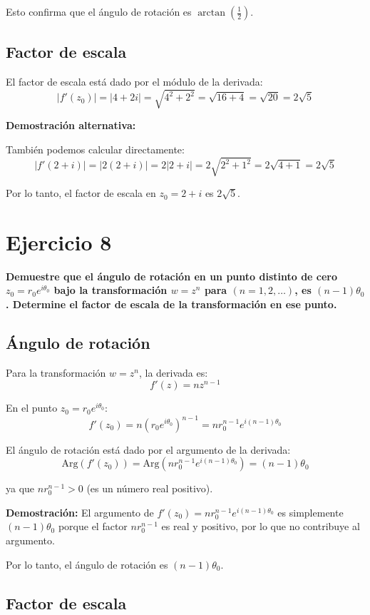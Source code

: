 \documentclass{article}
\begin{document}
Esto confirma que el ángulo de rotación es $\arctan\left(\frac{1}{2}\right)$.

\subsection*{Factor de escala}

El factor de escala está dado por el módulo de la derivada:
$$|f'(z_0)| = |4 + 2i| = \sqrt{4^2 + 2^2} = \sqrt{16 + 4} = \sqrt{20} = 2\sqrt{5}$$

\textbf{Demostración alternativa:}

También podemos calcular directamente:
$$|f'(2 + i)| = |2(2 + i)| = 2|2 + i| = 2\sqrt{2^2 + 1^2} = 2\sqrt{4 + 1} = 2\sqrt{5}$$

Por lo tanto, el factor de escala en $z_0 = 2 + i$ es $2\sqrt{5}$.

\section*{Ejercicio 8}

\textbf{Demuestre que el ángulo de rotación en un punto distinto de cero $z_0 = r_0 e^{i\theta_0}$ bajo la transformación $w = z^n$ para $(n = 1, 2, \ldots)$, es $(n - 1)\theta_0$. Determine el factor de escala de la transformación en ese punto.}

\subsection*{Ángulo de rotación}

Para la transformación $w = z^n$, la derivada es:
$$f'(z) = nz^{n-1}$$

En el punto $z_0 = r_0 e^{i\theta_0}$:
$$f'(z_0) = n(r_0 e^{i\theta_0})^{n-1} = nr_0^{n-1} e^{i(n-1)\theta_0}$$

El ángulo de rotación está dado por el argumento de la derivada:
$$\text{Arg}(f'(z_0)) = \text{Arg}(nr_0^{n-1} e^{i(n-1)\theta_0}) = (n - 1)\theta_0$$

ya que $nr_0^{n-1} > 0$ (es un número real positivo).

\textbf{Demostración:} El argumento de $f'(z_0) = nr_0^{n-1} e^{i(n-1)\theta_0}$ es simplemente $(n - 1)\theta_0$ porque el factor $nr_0^{n-1}$ es real y positivo, por lo que no contribuye al argumento.

Por lo tanto, el ángulo de rotación es $(n - 1)\theta_0$.

\subsection*{Factor de escala}
\end{document}
